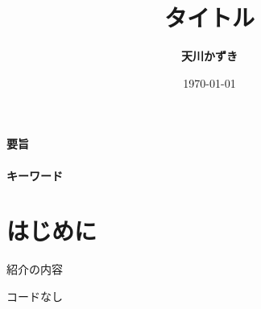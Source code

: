 \documentclass[UTF8]{ctexart}
\title{タイトル}
\author{\textbf{天川かずき}}
\date{\today}
\theoremstyle{plain}
\begin{document}
\maketitle
\noindent \textbf{要旨}\\
\\

\noindent \textbf{キーワード} \\[20ex]
\thispagestyle{empty}
\newpage
\tableofcontents
\thispagestyle{empty}
\newpage
\setcounter{page}{1}
\newpage
\section{はじめに}
紹介の内容



\newpage
\medskip



\noindent コード\texttt{$なし$}\\
\end{document}
